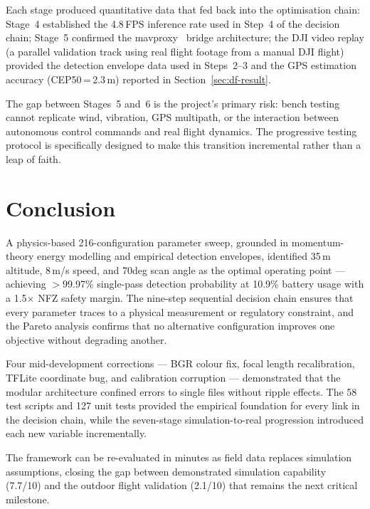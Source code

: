 \documentclass[10pt,a4paper]{article}
\def\textdegree{deg}%
\begin{document}
Each stage produced quantitative data that fed back into the optimisation chain: Stage~4 established the 4.8\,FPS inference rate used in Step~4 of the decision chain; Stage~5 confirmed the mavproxy~\citep{mavproxy} bridge architecture; the DJI video replay (a parallel validation track using real flight footage from a manual DJI flight) provided the detection envelope data used in Steps~2--3 and the GPS estimation accuracy (CEP50\,=\,2.3\,m) reported in Section~\ref{sec:df-result}.

The gap between Stages~5 and~6 is the project's primary risk: bench testing cannot replicate wind, vibration, GPS multipath, or the interaction between autonomous control commands and real flight dynamics. The progressive testing protocol is specifically designed to make this transition incremental rather than a leap of faith.


\section{Conclusion}\label{sec:conclusion}

A physics-based 216-configuration parameter sweep, grounded in momentum-theory energy modelling and empirical detection envelopes, identified 35\,m altitude, 8\,m/s speed, and 70\textdegree{} scan angle as the optimal operating point --- achieving $>$99.97\% single-pass detection probability at 10.9\% battery usage with a 1.5$\times$ NFZ safety margin. The nine-step sequential decision chain ensures that every parameter traces to a physical measurement or regulatory constraint, and the Pareto analysis confirms that no alternative configuration improves one objective without degrading another.

Four mid-development corrections --- BGR colour fix, focal length recalibration, TFLite coordinate bug, and calibration corruption --- demonstrated that the modular architecture confined errors to single files without ripple effects. The 58 test scripts and 127 unit tests provided the empirical foundation for every link in the decision chain, while the seven-stage simulation-to-real progression introduced each new variable incrementally.

The framework can be re-evaluated in minutes as field data replaces simulation assumptions, closing the gap between demonstrated simulation capability (7.7/10) and the outdoor flight validation (2.1/10) that remains the next critical milestone.




\end{document}
